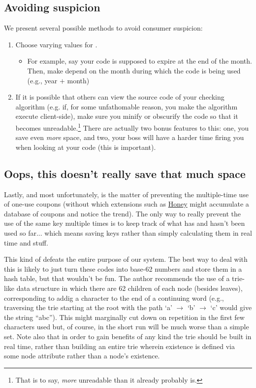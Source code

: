 \documentclass{article}
\newcommand{\M}{\rotatebox[origin=c]{180}{\textwon}}
\begin{document}
\begin{multicols}{2}
\subsection{Avoiding suspicion}

We present several possible methods to avoid consumer suspicion:

\begin{enumerate}
	\item Choose varying values for \M.
		\begin{itemize}
			\item For example, say your code is supposed to expire at the end of the month. Then, make \M \hspace{0.25em} depend on the month during which the code is being used (e.g., year $+$ month)
		\end{itemize}
	\item If it is possible that others can view the source code of your checking algorithm (e.g. if, for some unfathomable reason, you make the algorithm execute client-side), make sure you minify or obscurify the code so that it becomes unreadable.\footnote{That is to say, \emph{more} unreadable than it already probably is.} There are actually two bonus features to this: one, you save even \emph{more} space, and two, your boss will have a harder time firing you when looking at your code (this is important).
\end{enumerate}

\subsection{Oops, this doesn't really save that much space}

Lastly, and most unfortunately, is the matter of preventing the multiple-time use of one-use coupons (without which extensions such as \href{https://en.wikipedia.org/wiki/Honey}{Honey} might accumulate a database of coupons and notice the trend). The only way to really prevent the use of the same key multiple times is to keep track of what has and hasn't been used so far... which means saving keys rather than simply calculating them in real time and stuff. 

This kind of defeats the entire purpose of our system. The best way to deal with this is likely to just turn these codes into base-62 numbers and store them in a hash table, but that wouldn't be fun. The author recommends the use of a trie-like data structure in which there are 62 children of each node (besides leaves), corresponding to addig a character to the end of a continuing word (e.g., traversing the trie starting at the root with the path `a' $\to$ `b' $\to$ `c' would give the string ``abc''). This might marginally cut down on repetition in the first few characters used but, of course, in the short run will be much worse than a simple set. Note also that in order to gain benefits of any kind the trie should be built in real time, rather than building an entire trie wherein existence is defined via some node attribute rather than a node's existence.


\end{multicols}
\end{document}
